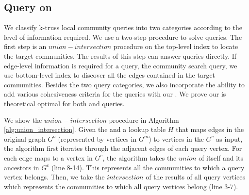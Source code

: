\subsection{Query on \TwoLevelIndex{}}
\label{query}
We classify k-truss local community queries into two categories according to the level of information required. We use a two-step procedure to solve queries. The first step is an $union-intersection$ procedure on the top-level index to locate the target communities. The results of this step can answer \toplevelprob{} queries directly. If edge-level information is required for a query, \eg the community search query, we use bottom-level index to discover all the edges contained in the target communities. Besides the two query categories, we also incorporate the ability to add various cohesiveness criteria for the queries with our \twolevelindex{}. We prove our \twolevelindex{} is theoretical optimal for both \toplevelprob{} and \bottomlevelprob{} queries.
%
%

We show the $union-intersection$ procedure in Algorithm \ref{alg:union_intersection}. Given the \twolevelindex{} and a lookup table $H$ that maps edges in the original graph $G^o$ (represented by vertices in $G^m$) to vertices in the \treeindex{} $G^c$ as input, the algorithm first iterates through the adjacent edges of each query vertex. For each edge maps to a vertex in $G^c$, the algorithm takes the $union$ of itself and its ancestors in $G^c$ (line 8-14). This represents all the communities to which a query vertex belongs. Then, we take the $intersection$ of the results of all query vertices which represents the communities to which all query vertices belong (line 3-7). 

